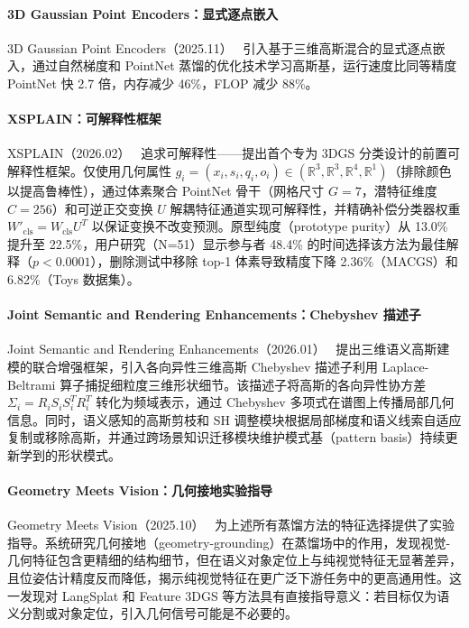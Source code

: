 \paragraph{3D Gaussian Point Encoders：显式逐点嵌入} 3D Gaussian Point Encoders（2025.11）~\cite{2511_04797} 引入基于三维高斯混合的显式逐点嵌入，通过自然梯度和 PointNet 蒸馏的优化技术学习高斯基，运行速度比同等精度 PointNet 快 2.7 倍，内存减少 46\%，FLOP 减少 88\%。

\paragraph{XSPLAIN：可解释性框架} XSPLAIN（2026.02）~\cite{2602_10239} 追求可解释性——提出首个专为 3DGS 分类设计的前置可解释性框架。仅使用几何属性 $g_i = (x_i, s_i, q_i, o_i) \in (\mathbb{R}^3, \mathbb{R}^3, \mathbb{R}^4, \mathbb{R}^1)$（排除颜色以提高鲁棒性），通过体素聚合 PointNet 骨干（网格尺寸 $G=7$，潜特征维度 $C=256$）和可逆正交变换 $U$ 解耦特征通道实现可解释性，并精确补偿分类器权重 $W'_{\text{cls}} = W_{\text{cls}} U^T$ 以保证变换不改变预测。原型纯度（prototype purity）从 13.0\% 提升至 22.5\%，用户研究（N=51）显示参与者 48.4\% 的时间选择该方法为最佳解释（$p < 0.0001$），删除测试中移除 top-1 体素导致精度下降 2.36\%（MACGS）和 6.82\%（Toys 数据集）。

\paragraph{Joint Semantic and Rendering Enhancements：Chebyshev 描述子} Joint Semantic and Rendering Enhancements（2026.01）~\cite{2601_02339} 提出三维语义高斯建模的联合增强框架，引入各向异性三维高斯 Chebyshev 描述子利用 Laplace-Beltrami 算子捕捉细粒度三维形状细节。该描述子将高斯的各向异性协方差 $\Sigma_i = R_i S_i S_i^T R_i^T$ 转化为频域表示，通过 Chebyshev 多项式在谱图上传播局部几何信息。同时，语义感知的高斯剪枝和 SH 调整模块根据局部梯度和语义线索自适应复制或移除高斯，并通过跨场景知识迁移模块维护模式基（pattern basis）持续更新学到的形状模式。

\paragraph{Geometry Meets Vision：几何接地实验指导} Geometry Meets Vision（2025.10）~\cite{2510_03104} 为上述所有蒸馏方法的特征选择提供了实验指导。系统研究几何接地（geometry-grounding）在蒸馏场中的作用，发现视觉-几何特征包含更精细的结构细节，但在语义对象定位上与纯视觉特征无显著差异，且位姿估计精度反而降低，揭示纯视觉特征在更广泛下游任务中的更高通用性。这一发现对 LangSplat 和 Feature 3DGS 等方法具有直接指导意义：若目标仅为语义分割或对象定位，引入几何信号可能是不必要的。

